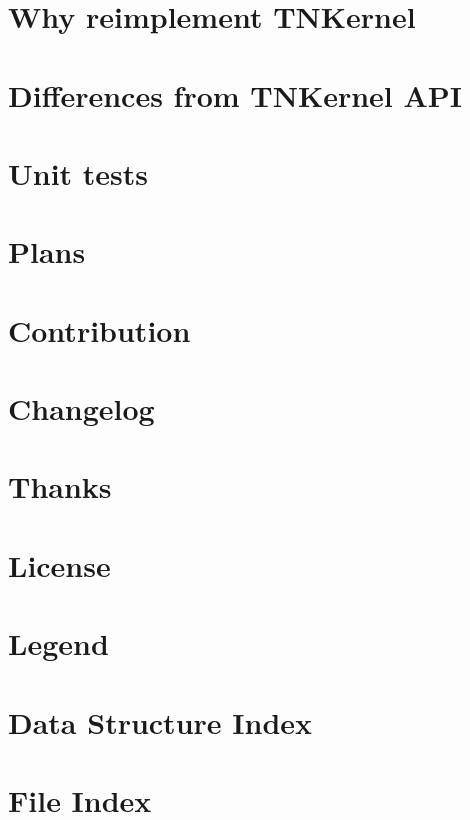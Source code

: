 \documentclass[twoside]{book}
\newcommand{\+}{\discretionary{\mbox{\scriptsize$\hookleftarrow$}}{}{}}
\begin{document}
\chapter{Why reimplement T\+N\+Kernel}
\label{why_reimplement}

\chapter{Differences from T\+N\+Kernel A\+PI}
\label{tnkernel_diff}

\chapter{Unit tests}
\label{unit_tests}

\chapter{Plans}
\label{plans}

\chapter{Contribution}
\label{contribution}

\chapter{Changelog}
\label{changelog}

\chapter{Thanks}
\label{thanks}

\chapter{License}
\label{license}

\chapter{Legend}
\label{legend}

\chapter{Data Structure Index}

\chapter{File Index}

\end{document}
